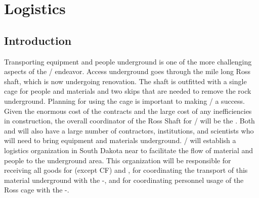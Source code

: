 \section{Logistics}
\label{sec:fdsp-tc-log}

\subsection{Introduction}
\label{sec:fdsp-tc-log-intro} 
Transporting equipment and people underground is one of the more challenging aspects of the / endeavor. Access underground goes through the mile long Ross shaft, which is now undergoing renovation. The shaft is outfitted with a single cage for people and materials and two skips that are needed to remove the rock underground. Planning for using the cage is important to making / a success. Given the enormous cost of the  contracts and the large cost of any inefficiencies in construction, the overall coordinator of the Ross Shaft for / will be the  . Both  and  will also have a large number of contractors, institutions, and scientists who will need to bring equipment and materials underground. / will establish a logistics organization in South Dakota near  to facilitate the flow of material and people to the underground area. This organization will be responsible for receiving all goods for  (except CF) and ,
for coordinating the transport of this material underground with the -, and
for coordinating personnel usage of the Ross cage with the -. 


 
